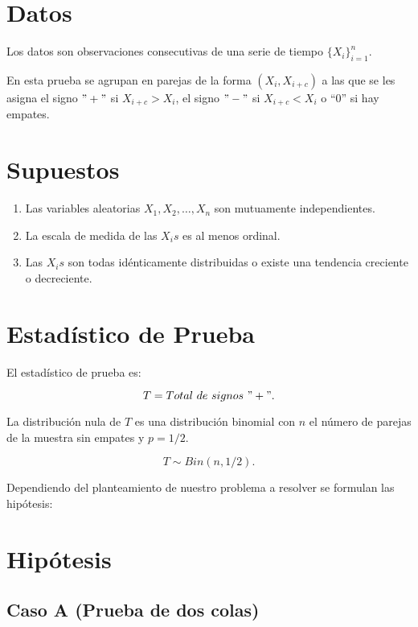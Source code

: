 \documentclass[
  a4paper,
  oneside,
  openany]{book}
\begin{document}
\hypertarget{datos-4}{%
\section{Datos}\label{datos-4}}

Los datos son observaciones consecutivas de una serie de tiempo \(\{X_{i}\}^{n}_{i=1}\).

En esta prueba se agrupan en parejas de la forma \((X_{i},X_{i+c})\) a las que se les asigna el signo \("+"\) si \(X_{i+c} > X_{i}\), el signo \("-"\) si \(X_{i+c} < X_{i}\) o ``0'' si hay empates.

\hypertarget{supuestos-4}{%
\section{Supuestos}\label{supuestos-4}}

\begin{enumerate}
\def\labelenumi{\arabic{enumi})}
\item
  Las variables aleatorias \(X_{1}, X_{2}, \ldots, X_{n}\) son mutuamente independientes.
\item
  La escala de medida de las \(X_{i}s\) es al menos ordinal.
\item
  Las \(X_{i}s\) son todas idénticamente distribuidas o existe una tendencia creciente o decreciente.
\end{enumerate}

\hypertarget{estaduxedstico-de-prueba-4}{%
\section{Estadístico de Prueba}\label{estaduxedstico-de-prueba-4}}

El estadístico de prueba es:

\[T=Total\ de\ signos\ "+".\]

La distribución nula de \(T\) es una distribución binomial con \(n\) el número de parejas de la muestra sin empates y \(p=1/2\).

\[T\sim Bin(n,1/2).\]

Dependiendo del planteamiento de nuestro problema a resolver se formulan las hipótesis:

\hypertarget{hipuxf3tesis-4}{%
\section{Hipótesis}\label{hipuxf3tesis-4}}

\hypertarget{caso-a-prueba-de-dos-colas-4}{%
\subsection*{Caso A (Prueba de dos colas)}\label{caso-a-prueba-de-dos-colas-4}}
\end{document}
